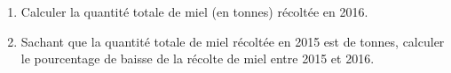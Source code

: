 \documentclass[11pt]{article}
\begin{document}
\begin{enumerate}
	\begin{enumerate}
		\item Calculer la quantité totale de miel (en tonnes) récoltée en 2016.
		\item Sachant que la quantité totale de miel récoltée en 2015 est de  tonnes, calculer le pourcentage de baisse de la récolte de miel entre 2015 et 2016.
	\end{enumerate}
\end{enumerate}
\end{document}
